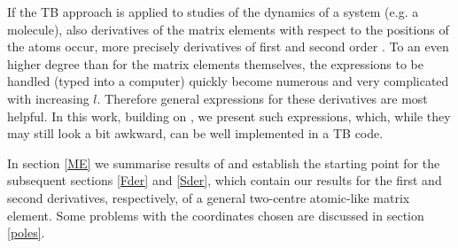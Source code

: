 \par{If the TB approach is applied to studies of the dynamics of a system (e.g. a molecule), also derivatives of the
matrix elements with respect to the positions of the atoms occur, more precisely derivatives of first and
second order \citep{Todorov01}.
To an even higher degree than for the matrix elements themselves, the expressions to
be handled (typed into a computer) quickly become numerous and very complicated with increasing $l$.
Therefore general expressions for these derivatives are most helpful. In this work, building on
\citep{Podolskiy04}, we
present such expressions, which, while they may still look a bit awkward, can be well implemented in a
TB code.}
\par{In section \ref{ME} we summarise results of \citep{Podolskiy04}
and establish the starting point for the subsequent
sections \ref{Fder} and \ref{Sder}, which contain our results for the first and second derivatives,
respectively, of a general two-centre atomic-like matrix element. Some problems with the coordinates
chosen are discussed in section \ref{poles}.   }
%
%

